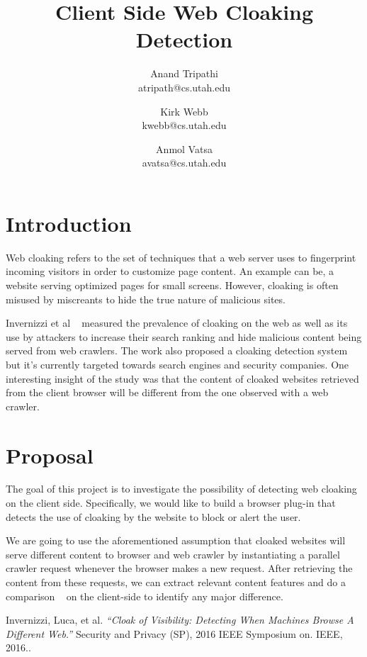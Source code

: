 \documentclass{article}
\title{Client Side Web Cloaking Detection}
\author{
Anand Tripathi\\
       atripath@cs.utah.edu
\and 
Kirk Webb\\
       kwebb@cs.utah.edu
\and
Anmol Vatsa\\
       avatsa@cs.utah.edu
}
\begin{document}
\maketitle

\section{Introduction}
Web cloaking refers to the set of techniques that a web server uses to fingerprint incoming visitors in order to customize page content. An example can be, a website serving optimized pages for small screens. However, cloaking is often misused by miscreants to hide the true nature of malicious sites.

Invernizzi et al ~\cite{cloak} measured the prevalence of cloaking on the web as well as its use by attackers to increase their search ranking and hide malicious content being served from web crawlers. The work also proposed a cloaking detection system but it's currently targeted towards search engines and security companies. One interesting insight of the study was that the content of cloaked websites retrieved from the client browser will be different from the one observed with a web crawler.

\section{Proposal}
The goal of this project is to investigate the possibility of detecting web cloaking on the client side.  Specifically, we would like to build a browser plug-in that detects the use of cloaking by the website to block or alert the user.

We are going to use the aforementioned assumption that cloaked websites will serve different content to browser and web crawler by instantiating a parallel crawler request whenever the browser makes a new request. After retrieving the content from these requests, we can extract relevant content features and do a comparison ~\cite{cloak} on the client-side to identify any major difference.


\begin{thebibliography}{1}

   Invernizzi, Luca, et al. {\em ``Cloak of Visibility: Detecting When Machines Browse A Different Web.''} Security and Privacy (SP), 2016 IEEE Symposium on. IEEE, 2016..

\end{thebibliography}
\end{document}
